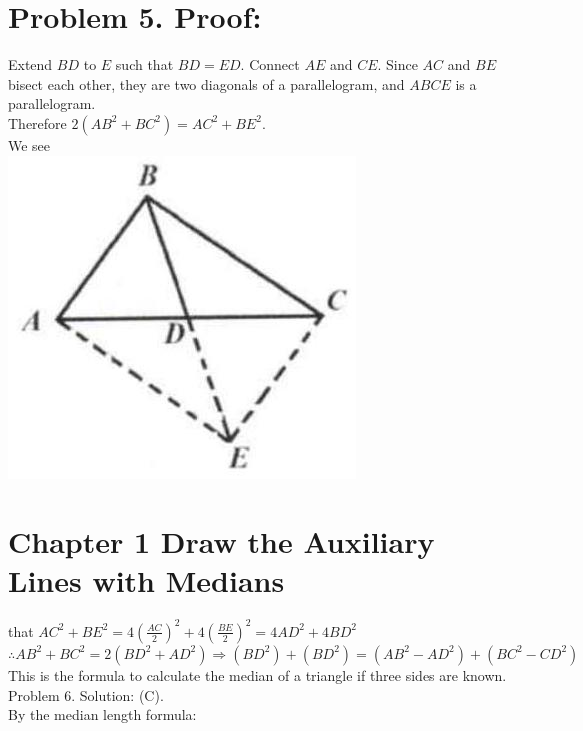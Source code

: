 \documentclass[10pt]{article}
\begin{document}
\section*{Problem 5. Proof:}
Extend \(B D\) to \(E\) such that \(B D=E D\). Connect \(A E\) and \(C E\). Since \(A C\) and \(B E\) bisect each other, they are two diagonals of a parallelogram, and \(A B C E\) is a parallelogram.\\
Therefore \(2\left(A B^{2}+B C^{2}\right)=A C^{2}+B E^{2}\).\\
We see\\
\includegraphics[max width=\textwidth, center]{2025_04_17_97bc1f7e44d93c271a88g-030(1)}

\section*{Chapter 1 Draw the Auxiliary Lines with Medians}
that \(A C^{2}+B E^{2}=4\left(\frac{A C}{2}\right)^{2}+4\left(\frac{B E}{2}\right)^{2}=4 A D^{2}+4 B D^{2}\)\\
\(\therefore A B^{2}+B C^{2}=2\left(B D^{2}+A D^{2}\right) \Rightarrow\left(B D^{2}\right)+\left(B D^{2}\right)=\left(A B^{2}-A D^{2}\right)+\left(B C^{2}-C D^{2}\right)\)\\
This is the formula to calculate the median of a triangle if three sides are known.\\
Problem 6. Solution: (C).\\
By the median length formula:
\end{document}
